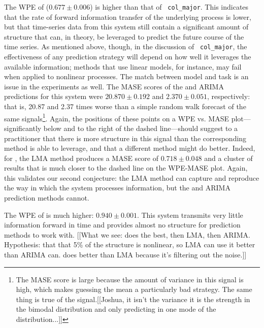 The WPE of \svdfive ($0.677 \pm 0.006$) is higher than that of {\tt
  col\_major}.  This indicates that the rate of forward information
transfer of the underlying process is lower, but that time-series data
from this system still contain a significant amount of structure that
can, in theory, be leveraged to predict the future course of the time
series.  As mentioned above, though, in the discussion of {\tt
  col\_major}, the effectiveness of any prediction strategy will
depend on how well it leverages the available information; methods
that use linear models, for instance, may fail when applied to
nonlinear processes.
% 
% 
The match between model and task is an issue in the \svdfive
experiments as well.  The MASE scores of the \naive and ARIMA
predictions for this system were $20.870 \pm 0.192$ and $2.370 \pm
0.051$, respectively: that is, 20.87 and 2.37 times worse than a
simple random walk forecast of the same signals\footnote{The \naive
  MASE score is large because the amount of variance in this signal is
  high, which makes guessing the mean a particularly bad strategy.
  The same thing is true of the \svdthree signal.{\color{red}[[Joshua, it isn't the variance it is the strength in the bimodal distribution and only predicting in one mode of the distribution...]]}}.  Again, the
positions of these points on a WPE vs. MASE plot---significantly below
and to the right of the dashed line---should suggest to a practitioner
that there is more structure in this signal than the corresponding
method is able to leverage, and that a different method might do
better.  Indeed, for \svdfive, the LMA method produces a MASE score of
$ 0.718\pm 0.048 $ and a cluster of results that is much closer to the
dashed line on the WPE-MASE plot.  Again, this validates our second
conjecture: the LMA method can capture and reproduce the way in which
the \svdfive system processes information, but the \naive and ARIMA
prediction methods cannot.

The WPE of \gcc is much higher: $0.940 \pm 0.001$.  This system
transmits very little information forward in time and provides almost
no structure for prediction methods to work with.  {\color{red}[[What we see:
    \naive does the best, then LMA, then ARIMA.  Hypothesis: that that
    5\% of the structure is nonlinear, so LMA can use it better than
    ARIMA can.  \naive does better than LMA because it's filtering out
    the noise.]]}

